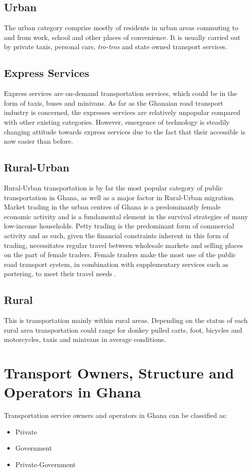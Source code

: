 \subsection{Urban}
The urban category comprise mostly of residents in urban areas commuting to and from work, school and other places of convenience. It is usually carried out by private taxis, personal cars, \textit{tro-tros} and state owned transport services.

\subsection{Express Services}
Express services are on-demand transportation services, which could be in the form of taxis, buses and minivans. As far as the Ghanaian road transport industry is concerned, the expresses services are relatively unpopular compared with other existing categories. However, emergence of technology is steadily changing attitude towards express services due to the fact that their accessible is now easier than before.

\subsection{Rural-Urban}
Rural-Urban transportation is by far the most popular category of public transportation in Ghana, as well as a major factor in Rural-Urban migration. Market trading in the urban centres of Ghana is a predominantly female economic activity and is a fundamental element in the survival strategies of many low-income households. Petty trading is the predominant form of commercial activity and as such, given the financial constraints inherent in this form of trading, necessitates regular travel between wholesale markets and selling places on the part of female traders. Female traders make the most use of the public road transport system, in combination with supplementary services such as portering, to meet their travel needs \citep{grieco1995informal}.

\subsection{Rural}
This is transportation mainly within rural areas. Depending on the status of each rural area transportation could range for donkey pulled carts, foot, bicycles and motorcycles, taxis and minivans in average conditions.

\section{Transport Owners, Structure and Operators in Ghana}
Transportation service owners and operators in Ghana can be classified as:
\begin{itemize}
	\item Private
	\item Government
	\item Private-Government
\end{itemize}

